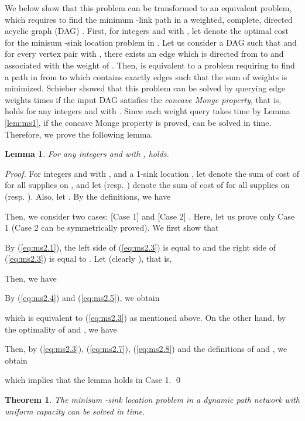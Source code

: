 \documentclass[a4paper]{llncs}
\newtheorem{thm}{Theorem}
\newtheorem{lem}{Lemma}
\begin{document}
We below show that this problem can be transformed to an equivalent problem, which requires to find the minimum -link path in a weighted, complete, directed acyclic graph (DAG) \cite{s98}.
First, for integers  and  with , let  denote the optimal cost for the minisum -sink location problem in .
Let us consider a DAG  such that  and
for every vertex pair  with , 
there exists an edge which is directed from  to  and associated with the weight of .
Then,  is equivalent to a problem requiring to find a path in  from  to  which contains exactly  edges such that the sum of weights is minimized.
Schieber \cite{s98} showed that this problem can be solved by querying edge weights  times
if the input DAG satisfies the {\it concave Monge property}, that is,  holds for any integers  and  with .
Since each weight query takes  time by Lemma \ref{lem:ms1}, if the concave Monge property is proved,  can be solved in  time.
Therefore, we prove the following lemma.
\begin{lem}
For any integers  and  with ,
 holds.
\label{lem:ms2}
\end{lem}
\begin{proof}
For integers  and  with , and a 1-sink location ,
let  denote the sum of cost of  for all supplies on ,
and let  (resp. ) denote the sum of cost of  for all supplies on  (resp. ).
Also, let .
By the definitions, we have

Then, we consider two cases: [Case 1]  and [Case 2] .
Here, let us prove only Case 1 (Case 2 can be symmetrically proved).
We first show that 

By (\ref{eq:ms2.1}), the left side of (\ref{eq:ms2.3}) is equal to  and the right side of (\ref{eq:ms2.3}) is equal to .
Let  (clearly ), that is,

Then, we have 

By (\ref{eq:ms2.4}) and (\ref{eq:ms2.5}), we obtain

which is equivalent to (\ref{eq:ms2.3}) as mentioned above.
On the other hand, by the optimality of  and , we have

Then, by (\ref{eq:ms2.3}), (\ref{eq:ms2.7}), (\ref{eq:ms2.8}) and the definitions of  and , we obtain

which implies that the lemma holds in Case 1.
\qed
\end{proof}

\begin{thm}
The minisum -sink location problem in a dynamic path network with uniform capacity can be solved in  time.
\label{thm:ms1}
\end{thm}
\end{document}
